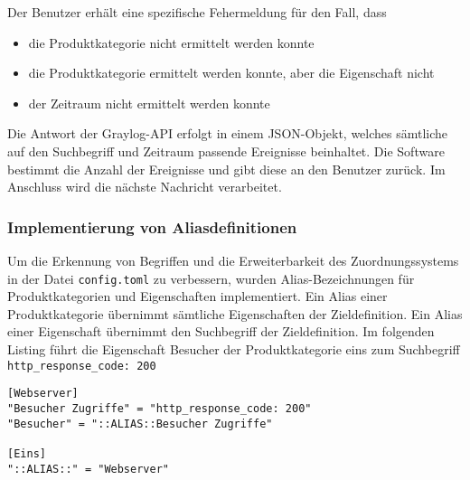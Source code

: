 Der Benutzer erhält eine spezifische Fehermeldung für den Fall, dass

\begin{itemize}
\item die Produktkategorie nicht ermittelt werden konnte
\item die Produktkategorie ermittelt werden konnte, aber die Eigenschaft nicht
\item der Zeitraum nicht ermittelt werden konnte
\end{itemize}

Die Antwort der Graylog-API erfolgt in einem JSON-Objekt, welches sämtliche auf den Suchbegriff und Zeitraum passende Ereignisse beinhaltet. Die Software bestimmt die Anzahl der Ereignisse und gibt diese an den Benutzer zurück. Im Anschluss wird die nächste Nachricht verarbeitet.

\subsubsection{Implementierung von Aliasdefinitionen}

Um die Erkennung von Begriffen und die Erweiterbarkeit des Zuordnungssystems in der Datei \lstinline{config.toml} zu verbessern, wurden Alias-Bezeichnungen für Produktkategorien und Eigenschaften implementiert. Ein Alias einer Produktkategorie übernimmt sämtliche Eigenschaften der Zieldefinition. Ein Alias einer Eigenschaft übernimmt den Suchbegriff der Zieldefinition. Im folgenden Listing führt die Eigenschaft Besucher der Produktkategorie eins zum Suchbegriff \lstinline{http_response_code: 200}

\begin{lstlisting}[caption={Aliasdefinitionen in der Datei config.toml}, label=alias-config-toml, xleftmargin=6mm]
[Webserver]
"Besucher Zugriffe" = "http_response_code: 200"
"Besucher" = "::ALIAS::Besucher Zugriffe"

[Eins]
"::ALIAS::" = "Webserver"
\end{lstlisting}
